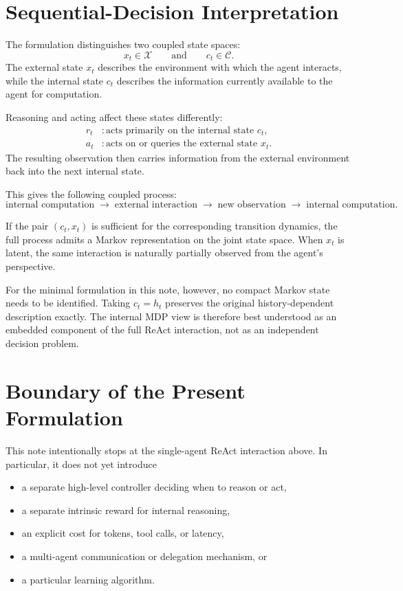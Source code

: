 \documentclass[11pt]{article}
\begin{document}
\section{Sequential-Decision Interpretation}

The formulation distinguishes two coupled state spaces:
\[
x_t\in\mathcal{X}
\qquad\text{and}\qquad
c_t\in\mathcal{C}.
\]
The external state \(x_t\) describes the environment with which the agent interacts, while the internal state \(c_t\) describes the information currently available to the agent for computation.

Reasoning and acting affect these states differently:
\begin{align*}
    r_t &: \text{acts primarily on the internal state } c_t,\\
    a_t &: \text{acts on or queries the external state } x_t.
\end{align*}
The resulting observation then carries information from the external environment back into the next internal state.

This gives the following coupled process:
\[
\text{internal computation}
\;\longrightarrow\;
\text{external interaction}
\;\longrightarrow\;
\text{new observation}
\;\longrightarrow\;
\text{internal computation}.
\]

If the pair \((c_t,x_t)\) is sufficient for the corresponding transition dynamics, the full process admits a Markov representation on the joint state space. When \(x_t\) is latent, the same interaction is naturally partially observed from the agent's perspective.

For the minimal formulation in this note, however, no compact Markov state needs to be identified. Taking \(c_t=h_t\) preserves the original history-dependent description exactly. The internal MDP view is therefore best understood as an embedded component of the full ReAct interaction, not as an independent decision problem.

\section{Boundary of the Present Formulation}

This note intentionally stops at the single-agent ReAct interaction above. In particular, it does not yet introduce
\begin{itemize}
    \item a separate high-level controller deciding when to reason or act,
    \item a separate intrinsic reward for internal reasoning,
    \item an explicit cost for tokens, tool calls, or latency,
    \item a multi-agent communication or delegation mechanism, or
    \item a particular learning algorithm.
\end{itemize}
\end{document}
